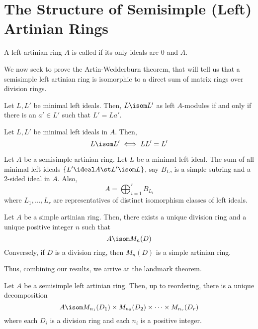 \documentclass[11pt,leqno,oneside]{amsbook}
\numberwithin{thm}{section}
\begin{document}
\section{The Structure of Semisimple (Left) Artinian Rings}
\begin{defn}
  A left artinian ring \(A\) is called  if its only ideals
  are \(0\) and \(A\).
\end{defn}
We now seek to prove the Artin-Wedderburn theorem, that will tell us
that a semisimple left artinian ring is isomorphic to a direct sum of
matrix rings over division rings.
\begin{lem}
  Let \(L,L'\) be minimal left ideals. Then, \(L \isom L'\) as left
  \(A\)-modules if and only if there is an \(a' \in L'\) such that
  \(L' = La'\).
\end{lem}
\begin{lem}
  Let \(L,L'\) be minimal left ideals in \(A\). Then, \[
    L \isom L' \iff LL' = L'
  \]
\end{lem}
\begin{thm}[Wedderburn]
  Let \(A\) be a semisimple artinian ring. Let \(L\) be a minimal left
  ideal. The sum of all minimal left ideals \(\{L' \ideal A
  \st L' \isom L\}\), say \(B_L\), is a simple subring and a
  \(2\)-sided ideal in \(A\). Also, \[
    A = \bigoplus_{i=1}^r B_{L_i}
  \]
  where \(L_1, \ldots, L_r\) are representatives of distinct
  isomorphism classes of left ideals.
\end{thm}
\begin{thm}[Wedderburn]
  Let \(A\) be a simple artinian ring. Then, there exists a unique
  division ring and a unique positive integer \(n\) such that \[
    A \isom M_n(D)
  \]
  Conversely, if \(D\) is a division ring, then \(M_n(D)\) is a simple
  artinian ring. 
\end{thm}
Thus, combining our results, we arrive at the landmark theorem.
\begin{thm}
  Let \(A\) be a semisimple left artinian ring. Then, up to reordering,
  there is a unique decomposition \[
    A \isom M_{n_1}(D_1) \times M_{n_2}(D_2) \times \cdots \times M_{n_r}(D_r)
  \]
  where each \(D_i\) is a division ring and each \(n_i\) is a positive
  integer.
\end{thm}
\begin{bibdiv}
  \begin{biblist}
  \end{biblist}
\end{bibdiv}
\end{document}
